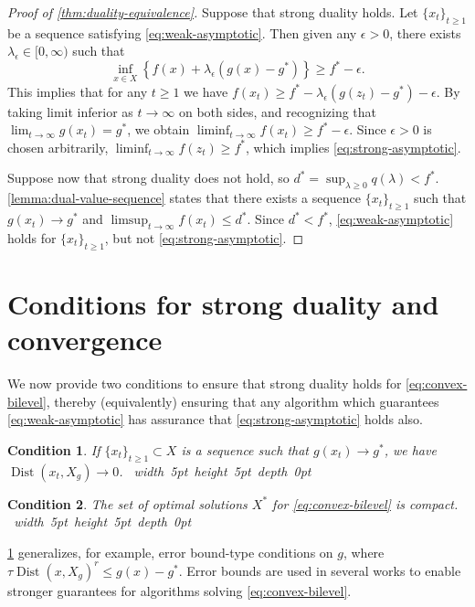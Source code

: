\documentclass[11pt,oneside]{article}
\theoremstyle{plain}
\theoremstyle{plain}
\theoremstyle{plain}%
\newtheorem{condition}{Condition}%
\DeclareMathOperator{\Dist}{Dist}
\newcommand{\epr}{\hfill\hbox{\hskip 4pt \vrule width 5pt height 5pt depth 0pt}\vspace{0.0cm}\par}
\begin{document}
{\begin{proof}[Proof of \cref{thm:duality-equivalence}]
Suppose that strong duality holds. Let $\{x_t\}_{t \geq 1}$ be a sequence satisfying \cref{eq:weak-asymptotic}. Then given any $\epsilon > 0$, there exists $\lambda_\epsilon \in [0,\infty)$ such that
\[
\inf_{x \in X} \left\{f(x)+\lambda_\epsilon(g(x)-g^*)\right\} \geq f^* -\epsilon.
\]
This implies that for any $t \geq 1$ we have
$f(x_t) \geq f^* -\lambda_\epsilon(g(z_t)-g^*)-\epsilon$. By taking limit inferior as $t\to\infty$ on both sides, and recognizing that $\lim_{t \to \infty} g(x_t) = g^*$, we obtain $\liminf_{t \to \infty} f(x_t) \geq f^* -\epsilon$. Since $\epsilon >0$ is chosen arbitrarily, $\liminf_{t \to \infty} f(z_t) \geq f^*$, which implies \eqref{eq:strong-asymptotic}.


Suppose now that strong duality does not hold, so $d^* = \sup_{\lambda \geq 0} q(\lambda) < f^*$. \cref{lemma:dual-value-sequence} states that there exists a sequence $\{x_t\}_{t \geq 1}$ such that $g(x_t) \to g^*$ and $\limsup_{t \to \infty} f(x_t) \leq d^*$. Since $d^* < f^*$, \cref{eq:weak-asymptotic} holds for $\{x_t\}_{t \geq 1}$, but not \cref{eq:strong-asymptotic}.
\end{proof}

\section{Conditions for strong duality and convergence}\label{sec:conditions}

We now provide two conditions to ensure that strong duality holds for \cref{eq:convex-bilevel}, thereby (equivalently) ensuring that any algorithm which guarantees \cref{eq:weak-asymptotic} has assurance that \cref{eq:strong-asymptotic} holds also.
\begin{condition}\label{cond:dist-g}
If $\{x_t\}_{t \geq 1} \subset X$ is a sequence such that $g(x_t) \to g^*$, we have $\Dist(x_t,X_g) \to 0$.
\epr
\end{condition}
\begin{condition}\label{cond:compact}
The set of optimal solutions $X^*$ for \cref{eq:convex-bilevel} is compact.
\epr
\end{condition}

\cref{cond:dist-g} generalizes, for example, error bound-type conditions on $g$, where $\tau \Dist(x,X_g)^r \leq g(x) - g^*$. Error bounds are used in several works \citep[e.g.,][]{JiangEtAl2023,CaoEtAl2024,MerchavEtAl2024} to enable stronger guarantees for algorithms solving \cref{eq:convex-bilevel}.

}
\end{document}
